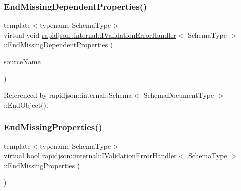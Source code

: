 \subsubsection{\texorpdfstring{EndMissingDependentProperties()}{EndMissingDependentProperties()}}
{\footnotesize\ttfamily template$<$typename Schema\+Type$>$ \\
virtual void \mbox{\hyperlink{classrapidjson_1_1internal_1_1_i_validation_error_handler}{rapidjson\+::internal\+::\+I\+Validation\+Error\+Handler}}$<$ Schema\+Type $>$\+::End\+Missing\+Dependent\+Properties (\begin{DoxyParamCaption}\item[{const \mbox{\hyperlink{classrapidjson_1_1internal_1_1_i_validation_error_handler_a8a2aaf7eb28a3ce7ed81689141f3af1f}{S\+Value}} \&}]{source\+Name }\end{DoxyParamCaption})\hspace{0.3cm}{\ttfamily [pure virtual]}}



Referenced by rapidjson\+::internal\+::\+Schema$<$ Schema\+Document\+Type $>$\+::\+End\+Object().

\mbox{\label{classrapidjson_1_1internal_1_1_i_validation_error_handler_a526d70abf63255317a748fccb20041c0}} 
\subsubsection{\texorpdfstring{EndMissingProperties()}{EndMissingProperties()}}
{\footnotesize\ttfamily template$<$typename Schema\+Type$>$ \\
virtual bool \mbox{\hyperlink{classrapidjson_1_1internal_1_1_i_validation_error_handler}{rapidjson\+::internal\+::\+I\+Validation\+Error\+Handler}}$<$ Schema\+Type $>$\+::End\+Missing\+Properties (\begin{DoxyParamCaption}{ }\end{DoxyParamCaption})\hspace{0.3cm}{\ttfamily [pure virtual]}}



